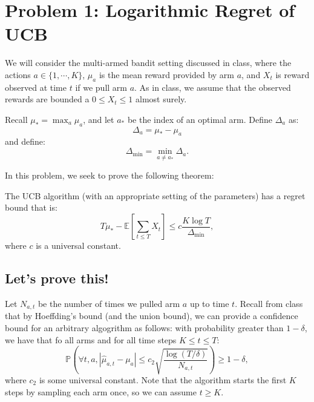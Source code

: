 \section*{Problem 1: Logarithmic Regret of UCB}

We will consider the multi-armed bandit setting discussed in class, where the
actions $a \in \{1,\cdots,K\}$, $\mu_a$ is the mean reward provided by arm $a$,
and $X_t$ is reward observed at time $t$ if we pull arm $a$. As in class, we
assume that the observed rewards are bounded a $0 \leq X_t \leq 1$ almost
surely.

Recall $\mu_* = \max_a\mu_a$, and let $a_*$ be the index of an optimal
arm. Define $\Delta_a$ as:
\begin{equation}
  \Delta_a = \mu_* - \mu_a
\end{equation}
and define:
\begin{equation}
  \Delta_{\min} = \min_{a \neq a_*} \Delta_a.
  \label{eqn:1_delta_min}
\end{equation}

In this problem, we seek to prove the following theorem:

\begin{theorem}
  The UCB algorithm (with an appropriate setting of the parameters) has a regret
  bound that is:
  \begin{equation}
    T\mu_* - \mathbb{E}\left[
      \sum_{t \leq T} X_t
    \right] \leq c \frac{K\log T}{\Delta_{\min}},
    \label{eqn:1_result}
  \end{equation}
  where $c$ is a universal constant.
\end{theorem}


\subsection*{Let's prove this!}

Let $N_{a,t}$ be the number of times we pulled arm $a$ up to time $t$. Recall
from class that by Hoeffding's bound (and the union bound), we can provide a
confidence bound for an arbitrary algogrithm as follows: with probability
greater than $1 - \delta$, we have that fo all arms and for all time steps $K
\leq t \leq T$:
\begin{equation}
  \mathbb{P}\left(\forall t, a, \left\lvert
      \hat{\mu}_{a,t} - \mu_a
    \right\rvert
    \leq  c_2 \sqrt{\frac{\log\left(T/\delta\right)}{N_{a,t}}}
  \right) \geq 1 - \delta,
  \label{eqn:1_confidence_interval}
\end{equation}
where $c_2$ is some universal constant. Note that the algorithm starts the first
$K$ steps by sampling each arm once, so we can assume $t \geq K$.

